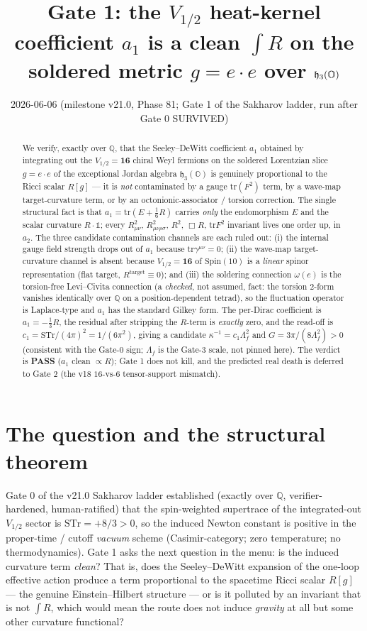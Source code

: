 \documentclass[11pt]{article}
\title{Gate 1: the $V_{1/2}$ heat-kernel coefficient $a_1$ is a clean $\int R$
on the soldered metric $g=e\!\cdot\!e$ over $\h_3(\Oo)$}
\date{2026-06-06 \quad (milestone v21.0, Phase 81; Gate 1 of the Sakharov ladder, run after Gate 0 SURVIVED)}
\newcommand{\STr}{\mathrm{STr}}
\newcommand{\h}{\mathfrak{h}}
\newcommand{\Oo}{\mathbb{O}}
\newcommand{\QQ}{\mathbb{Q}}
\newcommand{\tr}{\mathrm{tr}}
\newcommand{\Rt}{R^{\mathrm{target}}}
\begin{document}
\maketitle

\begin{abstract}
We verify, exactly over $\QQ$, that the Seeley--DeWitt coefficient $a_1$ obtained by
integrating out the $V_{1/2}=\mathbf{16}$ chiral Weyl fermions on the soldered Lorentzian
slice $g=e\!\cdot\!e$ of the exceptional Jordan algebra $\h_3(\Oo)$ is genuinely
proportional to the Ricci scalar $R[g]$ --- it is \emph{not} contaminated by a gauge
$\tr(F^2)$ term, by a wave-map target-curvature term, or by an octonionic-associator /
torsion correction. The single structural fact is that $a_1=\tr(E+\tfrac{1}{6}R)$ carries
\emph{only} the endomorphism $E$ and the scalar curvature $R\cdot\mathbb{1}$; every
$R_{\mu\nu}^2,\,R_{\mu\nu\rho\sigma}^2,\,R^2,\,\Box R,\,\tr F^2$ invariant lives one order
up, in $a_2$. The three candidate contamination channels are each ruled out: (i) the
internal gauge field strength drops out of $a_1$ because $\tr\gamma^{\mu\nu}=0$; (ii) the
wave-map target-curvature channel is absent because $V_{1/2}=\mathbf{16}$ of $\mathrm{Spin}(10)$
is a \emph{linear} spinor representation (flat target, $\Rt\equiv 0$); and (iii) the
soldering connection $\omega(e)$ is the torsion-free Levi--Civita connection (a
\emph{checked}, not assumed, fact: the torsion $2$-form vanishes identically over $\QQ$ on a
position-dependent tetrad), so the fluctuation operator is Laplace-type and $a_1$ has the
standard Gilkey form. The per-Dirac coefficient is $a_1=-\tfrac13 R$, the residual after
stripping the $R$-term is \emph{exactly} zero, and the read-off is $c_1=\STr/(4\pi)^2=
1/(6\pi^2)$, giving a candidate $\kappa^{-1}=c_1\Lambda_f^2$ and $G=3\pi/(8\Lambda_f^2)>0$
(consistent with the Gate-0 sign; $\Lambda_f$ is the Gate-3 scale, not pinned here). The
verdict is \textbf{PASS} ($a_1$ clean $\propto R$); Gate 1 does not kill, and the predicted
real death is deferred to Gate 2 (the v18 $16$-vs-$6$ tensor-support mismatch).
\end{abstract}

\section{The question and the structural theorem}\label{sec:setup}

Gate 0 of the v21.0 Sakharov ladder established (exactly over $\QQ$, verifier-hardened,
human-ratified) that the spin-weighted supertrace of the integrated-out $V_{1/2}$ sector is
$\STr=+8/3>0$, so the induced Newton constant is positive in the proper-time / cutoff
\emph{vacuum} scheme (Casimir-category; zero temperature; no thermodynamics). Gate 1 asks the
next question in the menu: is the induced curvature term \emph{clean}? That is, does the
Seeley--DeWitt expansion of the one-loop effective action produce a term proportional to the
spacetime Ricci scalar $R[g]$ --- the genuine Einstein--Hilbert structure --- or is it
polluted by an invariant that is not $\int R$, which would mean the route does not induce
\emph{gravity} at all but some other curvature functional?
\end{document}
